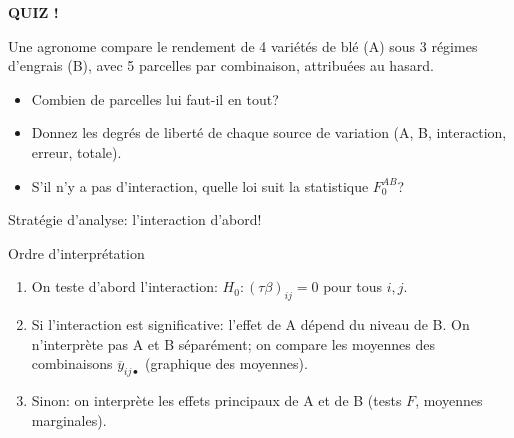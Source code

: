 \documentclass{BeamerTemplate}
\begin{document}
\begin{frame}[plain,t]
  \centerline{\LARGE\bfseries\alert{QUIZ !}}

  \medskip
  Une agronome compare le rendement de 4 variétés de blé (A) sous 3 régimes
  d'engrais (B), avec 5 parcelles par combinaison, attribuées au hasard.
  \begin{itemize}\itemsep 1.2cm
    \item Combien de parcelles lui faut-il en tout?
    \item Donnez les degrés de liberté de chaque source de variation (A, B,
    interaction, erreur, totale).
    \item S'il n'y a pas d'interaction, quelle loi suit la statistique $F_0^{AB}$?
  \end{itemize}
\end{frame}

\begin{frame}[t]{Stratégie d'analyse: l'interaction d'abord!}

\begin{Boite}{Ordre d'interprétation}
\small
\begin{enumerate}
  \item On teste d'abord l'\alert{interaction}:
  $H_0: (\tau\beta)_{ij}=0$ pour tous $i,j$.
  \item Si l'interaction est \alert{significative}: l'effet de A dépend du niveau
  de B. On \alert{n'interprète pas} A et B séparément; on compare les moyennes des
  combinaisons $\overline{y}_{ij\bullet}$ (graphique des moyennes).
  \item Sinon: on interprète les \alert{effets principaux} de A et de B (tests $F$,
  moyennes marginales).
\end{enumerate}
\end{Boite}


\end{frame}
\end{document}
